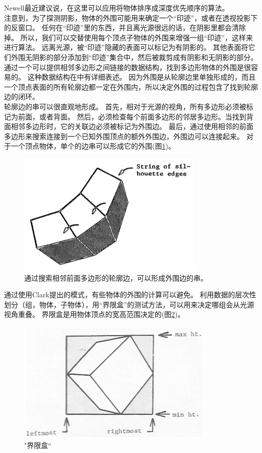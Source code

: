 Newell最近建议说，在这里可以应用将物体排序成深度优先顺序的算法\cite{10}。\\
注意到，为了探测阴影，物体的外围可能用来确定一个“印迹”，或者在透视投影下的反窗口。
任何在“印迹”里的东西，并且离光源很远的话，在阴影里都会清除掉。
所以，我们可以交替使用每个顶点子物体的外围来增强一组“印迹”，这样来进行算法。
远离光源，被“印迹”隐藏的表面可以标记为有阴影的。
其他表面将它们外围无阴影的部分添加到“印迹”集合中，然后被裁剪成有阴影和无阴影的部分。\\
通过一个可以提供相邻多边形之间链接的数据结构，找到多边形物体的外围是很容易的。
这种数据结构在\cite{6}\cite{8}中有详细表述。
因为外围是从轮廓边里单独形成的，而且一个顶点表面的所有轮廓边都一定在外围内，所以决定外围的过程包含了找到轮廓边的闭环。\\
轮廓边的串可以很直观地形成。
首先，相对于光源的视角，所有多边形必须被标记为前面，或者背面。
然后，必须检查每个前面多边形的邻居多边形。当找到背面相邻多边形时，它的关联边必须被标记为外围边。
最后，通过使用相邻的前面多边形来搜索连接到一个已知外围顶点的额外外围边，外围边可以连接起来。
对于一个顶点物体，单个的边串可以形成它的外围(图\ref{fig:fig2})。\\
\begin{figure}[h]
\centering
\includegraphics[width=0.9\linewidth]{fig2}
\caption[fig2]{通过搜索相邻前面多边形的轮廓边，可以形成外围边的串。}
\label{fig:fig2}
\end{figure}
通过使用Clark提出的模式，有些物体的外围的计算可以避免。
利用数据的层次性划分（组，物体，子物体），用“界限盒”的测试方法，可以用来决定哪组会从光源视角重叠。
界限盒是用物体顶点的宽高范围决定的(图\ref{fig:fig3})。
\begin{figure}[h]
\centering
\includegraphics[width=0.9\linewidth]{fig3}
\caption[fig3]{"界限盒“}
\label{fig:fig3}
\end{figure}

